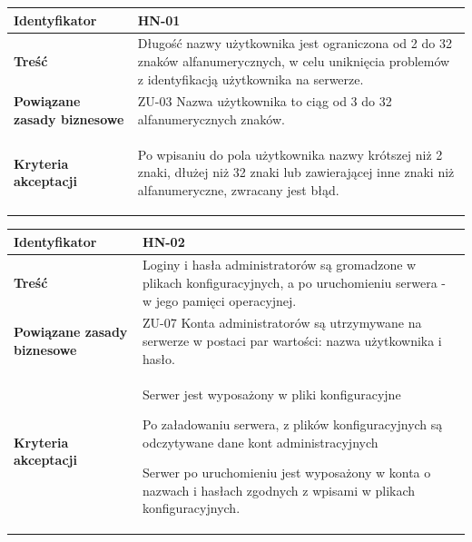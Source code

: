 \leavevmode\hbox{}

\begin{tabular}{ | l | l | }
	\hline
		\textbf{Identyfikator} &
		HN-01
		\\

	\hline
		\textbf{Treść} & \parbox[t]{11.5cm}{\strut
			Długość nazwy użytkownika jest ograniczona od 2 do 32 znaków alfanumerycznych, w celu uniknięcia problemów z identyfikacją użytkownika na serwerze.
		\strut}\\

	\hline
		\parbox[t]{4cm}{\textbf{Powiązane zasady biznesowe}} & \parbox[t]{11.5cm}{\strut
			ZU-03 Nazwa użytkownika to ciąg od 3 do 32 alfanumerycznych znaków.
		\strut}\\

	\hline
		\parbox[t]{4cm}{\textbf{Kryteria akceptacji}} & \parbox[t]{11.5cm}{\strut
			\begin{enumreq}
				\item Po wpisaniu do pola użytkownika nazwy krótszej niż 2 znaki, dłużej niż 32 znaki lub zawierającej inne znaki niż alfanumeryczne, zwracany jest błąd.
			\end{enumreq}
			\strut}
		\\

	\hline
\end{tabular}

\vspace{1em}

\begin{tabular}{ | l | l | }
	\hline
		\textbf{Identyfikator} &
		HN-02
		\\

	\hline
		\textbf{Treść} & \parbox[t]{11.5cm}{\strut
			Loginy i hasła administratorów są gromadzone w plikach
      konfiguracyjnych, a po uruchomieniu serwera - w jego
      pamięci operacyjnej.
		\strut}\\

	\hline
		\parbox[t]{4cm}{\textbf{Powiązane zasady biznesowe}} & \parbox[t]{11.5cm}{\strut
			ZU-07 Konta administratorów są utrzymywane na serwerze w postaci par wartości: nazwa użytkownika i hasło.
		\strut}\\

	\hline
		\parbox[t]{4cm}{\textbf{Kryteria akceptacji}} & \parbox[t]{11.5cm}{\strut
			\begin{enumreq}
				\item Serwer jest wyposażony w pliki konfiguracyjne
        \item Po załadowaniu serwera, z plików konfiguracyjnych
        są odczytywane dane kont administracyjnych
        \item Serwer po uruchomieniu jest wyposażony w konta o
        nazwach i hasłach zgodnych z wpisami w plikach konfiguracyjnych.
			\end{enumreq}
			\strut}
		\\

	\hline
\end{tabular}

